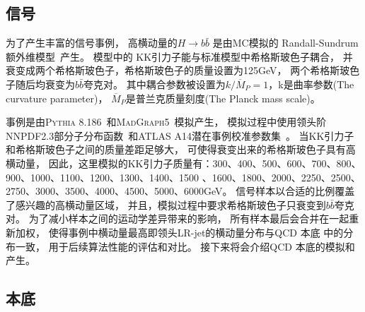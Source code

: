 \subsection{信号}
\label{sec:XbbSimS}

为了产生丰富的信号事例，
高横动量的$H\rightarrow b\bar{b}$%
是由MC模拟的
Randall-Sundrum额外维模型~\cite{Randall:1999ee}产生。
模型中的
KK引力子能与标准模型中希格斯玻色子耦合，%
并衰变成两个希格斯玻色子，希格斯玻色子的质量设置为125GeV，
两个希格斯玻色子随后均衰变为$b\bar{b}$夸克对。
其中耦合参数被设置为$k/\overline{M}_P=1$，k是曲率参数(The curvature parameter)，
$\overline{M}_P$是普兰克质量刻度(The Planck mass scale)。

事例是由\textsc{Pythia 8.186}~\cite{Sjostrand:2007gs}和\textsc{MadGraph5}~\cite{Alwall:2014hca}模拟产生，
模拟过程中使用领头阶NNPDF2.3部分子分布函数~\cite{Martin:2009iq}和\textsc{ATLAS A14}潜在事例校准参数集~\cite{ATL-PHYS-PUB-2014-021}。
当KK引力子和希格斯玻色子之间的质量差距足够大，
可使得衰变出来的希格斯玻色子具有高横动量，
因此，这里模拟的KK引力子质量有：300、400、500、600、700、800、900、1000、1100、1200、1300、1400、1500
、1600、1800、2000、2250、2500、2750、3000、3500、4000、4500、5000、6000GeV。
信号样本以合适的比例覆盖了感兴趣的高横动量区域，
并且，模拟过程中要求希格斯玻色子只衰变到$b\bar{b}$夸克对。
为了减小样本之间的运动学差异带来的影响，
所有样本最后会合并在一起重新加权，
使得事例中横动量最高即领头LR-jet的横动量分布与QCD
本底
中的分布一致，
用于后续算法性能的评估和对比。
接下来将会介绍QCD
本底的模拟和产生。


\subsection{本底}
\label{sec:XbbSimB}

